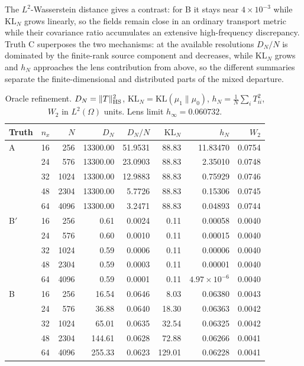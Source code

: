 \documentclass[11pt]{article}
\numberwithin{table}{section}
\numberwithin{figure}{section}
\begin{document}
The $L^2$-Wasserstein distance gives a contrast: for B it stays near $4\times10^{-3}$ while $\mathrm{KL}_N$ grows linearly, so the fields remain close in an ordinary transport metric while their covariance ratio accumulates an extensive high-frequency discrepancy. Truth C superposes the two mechanisms: at the available resolutions $D_N/N$ is dominated by the finite-rank source component and decreases, while $\mathrm{KL}_N$ grows and $h_N$ approaches the lens contribution from above, so the different summaries separate the finite-dimensional and distributed parts of the mixed departure.

\begin{table}[htbp]
\centering
\caption{Oracle refinement. $D_N=\|T\|_{\rm HS}^2$, $\mathrm{KL}_N=\mathrm{KL}(\mu_1\|\mu_0)$, $h_N=\frac1N\sum_iT_{ii}^2$, $W_2$ in $L^2(\Omega)$ units. Lens limit $h_\infty=0.060732$.}
\label{tab:T5_1}
\begin{tabular}{@{}llrrrrrr@{}}
\toprule
Truth & $n_x$ & $N$ & $D_N$ & $D_N/N$ & $\mathrm{KL}_N$ & $h_N$ & $W_2$ \\
\midrule
A & 16 & 256 & 13300.00 & 51.9531 & 88.83 & 11.83470 & 0.0754 \\
 & 24 & 576 & 13300.00 & 23.0903 & 88.83 & 2.35010 & 0.0748 \\
 & 32 & 1024 & 13300.00 & 12.9883 & 88.83 & 0.75929 & 0.0746 \\
 & 48 & 2304 & 13300.00 & 5.7726 & 88.83 & 0.15306 & 0.0745 \\
 & 64 & 4096 & 13300.00 & 3.2471 & 88.83 & 0.04893 & 0.0744 \\
\midrule
B$'$ & 16 & 256 & 0.61 & 0.0024 & 0.11 & 0.00058 & 0.0040 \\
 & 24 & 576 & 0.60 & 0.0010 & 0.11 & 0.00015 & 0.0040 \\
 & 32 & 1024 & 0.59 & 0.0006 & 0.11 & 0.00006 & 0.0040 \\
 & 48 & 2304 & 0.59 & 0.0003 & 0.11 & 0.00001 & 0.0040 \\
 & 64 & 4096 & 0.59 & 0.0001 & 0.11 & $4.97\times10^{-6}$ & 0.0040 \\
\midrule
B & 16 & 256 & 16.54 & 0.0646 & 8.03 & 0.06380 & 0.0043 \\
 & 24 & 576 & 36.88 & 0.0640 & 18.30 & 0.06363 & 0.0042 \\
 & 32 & 1024 & 65.01 & 0.0635 & 32.54 & 0.06325 & 0.0042 \\
 & 48 & 2304 & 144.61 & 0.0628 & 72.88 & 0.06266 & 0.0041 \\
 & 64 & 4096 & 255.33 & 0.0623 & 129.01 & 0.06228 & 0.0041 \\

\end{tabular}
\end{table}
\end{document}
